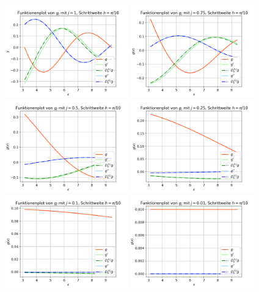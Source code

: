 \documentclass{scrartcl}
\begin{document}
\vspace{0.4cm}
{
  \centering
    \includegraphics[width=0.4\textwidth]{Grafiken/Funktionenplot_j1_Pi_Zehntel}
    \includegraphics[width=0.4\textwidth]{Grafiken/Funktionenplot_j075_Pi_Zehntel}\\
    \includegraphics[width=0.4\textwidth]{Grafiken/Funktionenplot_j05_Pi_Zehntel}
    \includegraphics[width=0.4\textwidth]{Grafiken/Funktionenplot_j025_Pi_Zehntel}\\
    \includegraphics[width=0.4\textwidth]{Grafiken/Funktionenplot_j01_Pi_Zehntel}
    \includegraphics[width=0.4\textwidth]{Grafiken/Funktionenplot_j001_Pi_Zehntel}\\
    \vspace{-0.2cm}

}
\end{document}
